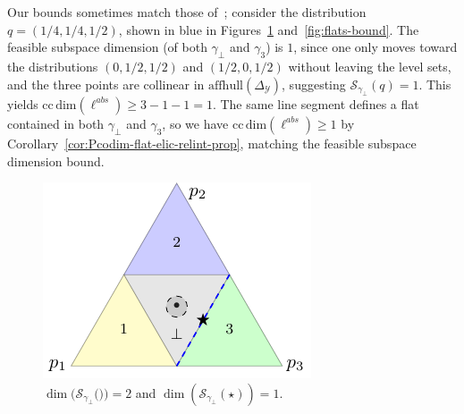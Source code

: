 \documentclass[anon,12pt]{colt2021} %
\newcommand{\Comments}{1}
\newcommand{\mynote}[2]{\ifnum\Comments=1\textcolor{#1}{#2}\fi}
\newcommand{\raf}[1]{\mynote{green}{[RF: #1]}}
\newcommand{\simplex}{\Delta_\Y}
\newcommand{\ccdim}{\mathrm{cc\,dim}}
\newcommand{\affhull}{\mathrm{affhull}}
\newcommand{\Sc}{\mathcal{S}}  %
\newcommand{\Y}{\mathcal{Y}}
\begin{document}
Our bounds sometimes match those of~\citep{ramaswamy2016convex}; consider the distribution $q = (1/4, 1/4, 1/2)$, shown in blue in Figures~\ref{fig:fsd-bound} and~\ref{fig:flats-bound}.
The feasible subspace dimension (of both $\gamma_\bot$ and $\gamma_3$) is $1$, since one only moves toward the distributions $(0,1/2, 1/2)$ and $(1/2, 0, 1/2)$ without leaving the level sets, and the three points are collinear in $\affhull(\simplex)$, suggesting $\Sc_{\gamma_\bot}(q) = 1$.  
This yields $\ccdim(\ell^{abs}) \geq 3 - 1- 1 = 1$.
The same line segment defines a flat contained in both $\gamma_\bot$ and $\gamma_3$, so we have $\ccdim(\ell^{abs}) \geq 1$ by Corollary~\ref{cor:Pcodim-flat-elic-relint-prop}, matching the feasible subspace dimension bound.


\begin{figure}[ht]
\begin{minipage}{0.45\linewidth}
	\centering
	\includegraphics[width=\linewidth]{tikz/fsd-bound.pdf}
	\caption{%
          $\dim(\Sc_{\gamma_\bot}($\textbullet$)) = 2$ and $\dim(\Sc_{\gamma_\bot}(\star)) = 1$.
          \vspace*{-5pt}        }
	\label{fig:fsd-bound}
\end{minipage}
\hfill
\begin{minipage}{0.45\linewidth}
	\centering

\end{minipage}
\end{figure}
\end{document}
